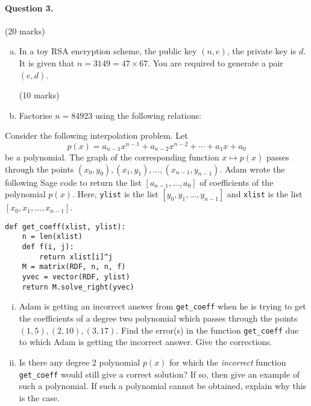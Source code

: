 \documentclass[12pt]{article}
\begin{document}
\paragraph{Question 3.}\hfill (20 marks)
\begin{enumerate}[(a)]
\item In a toy RSA encryption scheme, the public key $(n,e)$, the private key is $d$. It is given that $n=3149=47\times 67$. You are required to generate a pair $(e,d)$.
{\vspace{-0.5em}\begin{flushright} (10 marks)\end{flushright}}
\item Factorise $n=84923$ using the following relations:
\end{enumerate}
Consider the following interpolation problem. Let 
$$p(x) = a_{n-1} x^{n-1} +  a_{n-2} x^{n-2}
+ \cdots + a_1 x + a_0$$ be a polynomial. The graph of the corresponding
function $x\mapsto p(x)$ passes through the
points $(x_0, y_0), (x_1, y_1), \dots, (x_{n-1}, y_{n-1})$.
\noindent Adam wrote the following Sage code to return the list $[a_{n-1},\dots,a_0]$
of coefficients of the polynomial $p(x)$.
Here, \verb|ylist| is the list $[y_0, y_1, \dots, y_{n-1}]$ and
\verb|xlist| is the list $[x_0, x_1, \dots, x_{n-1}]$.
\begin{verbatim}
def get_coeff(xlist, ylist):
    n = len(xlist)
    def f(i, j):
        return xlist[i]^j
    M = matrix(RDF, n, n, f)
    yvec = vector(RDF, ylist)
    return M.solve_right(yvec)
\end{verbatim}
\begin{enumerate}[(i)]
    \item Adam is getting an incorrect answer   from \verb|get_coeff| when he
    is trying to get the coefficients of a degree two polynomial which
    passes through the points $(1, 5), (2, 10), (3, 17)$. Find the error(s) in
    the function \verb|get_coeff| due to which Adam is getting the
    incorrect answer. Give the corrections.
    \item Is there any degree 2 polynomial $p(x)$ for which the
    \emph{incorrect} function \verb|get_coeff| would still give a correct
    solution? If so, then give an example of such a polynomial. If such
    a polynomial cannot be obtained, explain why this is the case.
\end{enumerate}

\bigskip
\bigskip
\newpage 
\end{document}
